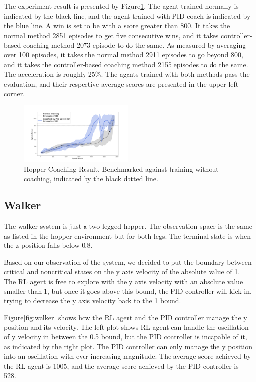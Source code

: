 \documentclass[journal]{IEEEtran}
\begin{document}
The experiment result is presented by Figure\ref{fig:hopper_result}. The agent trained normally is indicated by the black line, and the agent trained with PID coach is indicated by the blue line. A win is set to be with a score greater than 800. It takes the normal method 2851 episodes to get five consecutive wins, and it takes controller-based coaching method 2073 episode to do the same. As measured by averaging over 100 episodes, it takes the normal method 2911 episodes to go beyond 800, and it takes the controller-based coaching method 2155 episodes to do the same. The acceleration is roughly 25\%. The agents trained with both methods pass the evaluation, and their respective average scores are presented in the upper left corner.


\begin{figure}
     \centering
      \includegraphics[width=0.5\textwidth]{hopper.png}
      \caption{Hopper Coaching Result. Benchmarked against training without coaching, indicated by the black dotted line.}
      \label{fig:hopper_result}
\end{figure}



\subsection{Walker}
The walker system is just a two-legged hopper. The observation space is the same as listed in the hopper environment but for both legs. The terminal state is when the z position falls below 0.8.

Based on our observation of the system, we decided to put the boundary between critical and noncritical states on the y axis velocity of the absolute value of 1. The RL agent is free to explore with the y axis velocity with an absolute value smaller than 1, but once it goes above this bound, the PID controller will kick in, trying to decrease the y axis velocity back to the 1 bound.

Figure\ref{fig:walker} shows how the RL agent and the PID controller manage the y position and its velocity. The left plot shows RL agent can handle the oscillation of y velocity in between the 0.5 bound, but the PID controller is incapable of it, as indicated by the right plot. The PID controller can only manage the y position into an oscillation with ever-increasing magnitude. The average score achieved by the RL agent is 1005, and the average score achieved by the PID controller is 528.
\end{document}
